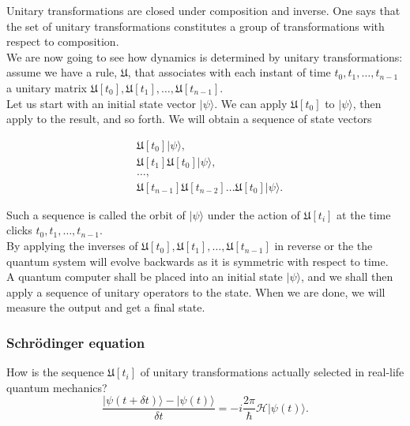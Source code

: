 \documentclass{article}
\begin{document}
Unitary transformations are closed under composition and inverse. One says that the set of unitary transformations constitutes a group of transformations with respect to composition.\\

We are now going to see how dynamics is determined by unitary transformations: assume we have a rule, $\mathfrak{U}$, that associates with each instant of time $t_0, t_1, \ldots, t_{n-1}$ a unitary matrix $\mathfrak{U}[t_0], \mathfrak{U}[t_1], \ldots, \mathfrak{U}[t_{n-1}]$.\\

Let us start with an initial state vector $|\psi\rangle$. We can apply $\mathfrak{U}[t_0]$ to $|\psi\rangle$, then apply to the result, and so forth. We will obtain a sequence of state vectors

\begin{equation}
\begin{aligned}
    &\mathfrak{U}[t_0]|\psi\rangle,\\
    &\mathfrak{U}[t_1]\mathfrak{U}[t_0]|\psi\rangle,\\
    &\ldots,\\
    &\mathfrak{U}[t_{n-1}]\mathfrak{U}[t_{n-2}]\ldots\mathfrak{U}[t_0]|\psi\rangle.
\end{aligned}
\end{equation}

Such a sequence is called the orbit of $|\psi\rangle$ under the action of $\mathfrak{U}[t_i]$ at the time clicks $t_0, t_1, \ldots, t_{n-1}$.\\

By applying the inverses of $\mathfrak{U}[t_0], \mathfrak{U}[t_1], \ldots, \mathfrak{U}[t_{n-1}]$ in reverse or the the quantum system will evolve backwards as it is symmetric with respect to time.\\

A quantum computer shall be placed into an initial state $|\psi\rangle$, and we shall then apply a sequence of unitary operators to the state. When we are done, we will measure the output and get a final state.

\subsubsection*{Schr\"{o}dinger equation}
How is the sequence $\mathfrak{U}[t_i]$ of unitary transformations actually selected in real-life quantum mechanics?
\begin{equation}
    \frac{|\psi(t+\delta t)\rangle - |\psi(t)\rangle}{\delta t} = -i\frac{2\pi}{\hslash}\mathcal{H}|\psi(t)\rangle.
\end{equation}
\end{document}
